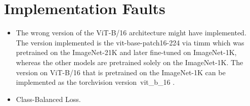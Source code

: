 \section{Implementation Faults}

\begin{itemize}
    \item The wrong version of the ViT-B/16 architecture might have implemented. The version implemented is the vit-base-patch16-224  \cite{huggingface2024vitbase}  via timm which was pretrained on the ImageNet-21K and later fine-tuned on ImageNet-1K, whereas the other models are pretrained solely on the ImageNet-1K. The version on ViT-B/16 that is pretrained on the ImageNet-1K can be implemented as the torchvision version\ vit\_b\_16 \cite{torchvision2024vitb16}.
    \item Class-Balanced Loss.
\end{itemize}